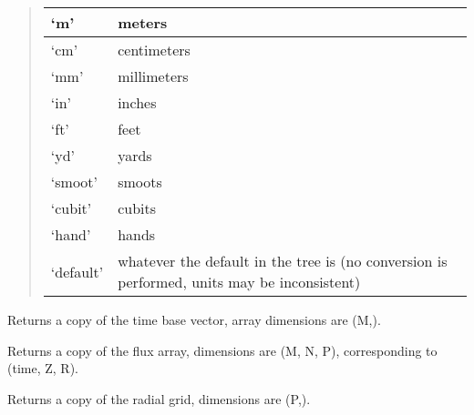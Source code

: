 \documentclass[letterpaper,10pt,english]{sphinxmanual}
\begin{document}
\begin{fulllineitems}
\begin{quote}
\begin{description}
\begin{tabulary}{\linewidth}{|L|L|}
\hline

`m'
 & 
meters
\\\hline

`cm'
 & 
centimeters
\\\hline

`mm'
 & 
millimeters
\\\hline

`in'
 & 
inches
\\\hline

`ft'
 & 
feet
\\\hline

`yd'
 & 
yards
\\\hline

`smoot'
 & 
smoots
\\\hline

`cubit'
 & 
cubits
\\\hline

`hand'
 & 
hands
\\\hline

`default'
 & 
whatever the default in the tree is (no conversion is performed, units may be inconsistent)
\\\hline
\end{tabulary}


\end{description}\end{quote}

\begin{fulllineitems}
\label{eqtools:eqtools.FromArrays.ArrayEquilibrium.getTimeBase}
Returns a copy of the time base vector, array dimensions are (M,).

\end{fulllineitems}


\begin{fulllineitems}
\label{eqtools:eqtools.FromArrays.ArrayEquilibrium.getFluxGrid}
Returns a copy of the flux array, dimensions are (M, N, P), corresponding to (time, Z, R).

\end{fulllineitems}


\begin{fulllineitems}
\label{eqtools:eqtools.FromArrays.ArrayEquilibrium.getRGrid}
Returns a copy of the radial grid, dimensions are (P,).


\end{fulllineitems}
\end{fulllineitems}
\end{document}
